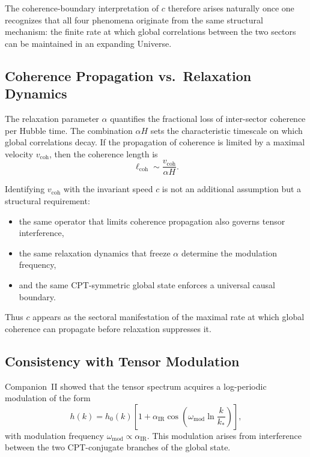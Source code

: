 \documentclass[11pt,a4paper]{article}
\begin{document}
The coherence-boundary interpretation of $c$ therefore arises naturally once one recognizes
that all four phenomena originate from the same structural mechanism: the finite rate at which
global correlations between the two sectors can be maintained in an expanding Universe.

\subsection{Coherence Propagation vs.\ Relaxation Dynamics}

The relaxation parameter $\alpha$ quantifies the fractional loss of inter-sector coherence per
Hubble time. The combination $\alpha H$ sets the characteristic timescale on which global
correlations decay. If the propagation of coherence is limited by a maximal velocity
$v_{\mathrm{coh}}$, then the coherence length is
\begin{equation}
    \ell_{\mathrm{coh}} \sim \frac{v_{\mathrm{coh}}}{\alpha H}.
\end{equation}

Identifying $v_{\mathrm{coh}}$ with the invariant speed $c$ is not an additional assumption but a
structural requirement:
\begin{itemize}
    \item the same operator that limits coherence propagation also governs tensor interference,
    \item the same relaxation dynamics that freeze $\alpha$ determine the modulation frequency,
    \item and the same CPT-symmetric global state enforces a universal causal boundary.
\end{itemize}

Thus $c$ appears as the sectoral manifestation of the maximal rate at which global coherence
can propagate before relaxation suppresses it.

\subsection{Consistency with Tensor Modulation}

Companion~II showed that the tensor spectrum acquires a log-periodic modulation of the form
\begin{equation}
    h(k) = h_{0}(k)\left[1 + \alpha_{\mathrm{IR}}
    \cos\!\left(\omega_{\mathrm{mod}}\ln\frac{k}{k_{\ast}}\right)\right],
\end{equation}
with modulation frequency $\omega_{\mathrm{mod}} \propto \alpha_{\mathrm{IR}}$. This modulation arises
from interference between the two CPT-conjugate branches of the global state.
\end{document}
